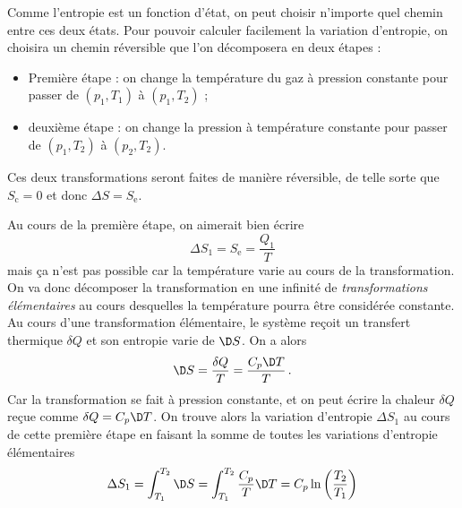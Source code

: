 \documentclass{cours}
\begin{document}
Comme l'entropie est un fonction d'état, on peut choisir n'importe quel chemin entre ces deux états. Pour pouvoir calculer facilement la variation d'entropie, on choisira un chemin réversible que l'on décomposera en deux étapes :
\begin{itemize}
  \item Première étape : on change la température du gaz à pression constante pour passer de $(p_1, T_1)$ à $(p_1, T_2)$ ;
  \item deuxième étape : on change la pression à température constante pour passer de $(p_1, T_2)$ à $(p_2, T_2)$.  
\end{itemize}
Ces deux transformations seront faites de manière réversible, de telle sorte que $S_\text{c}=0$ et donc $\Delta S = S_\text{e}$. 

Au cours de la première étape, on aimerait bien écrire 
\begin{equation}
  \Delta S_1 = S_\text{e} = \frac{Q_1}{T}
\end{equation}
mais ça n'est pas possible car la température varie au cours de la transformation. On va donc décomposer la transformation en une infinité de \emph{transformations élémentaires} au cours desquelles la température pourra être considérée constante. Au cours d'une transformation élémentaire, le système reçoit un transfert thermique $\delta Q$ et son entropie varie de $\D S$. On a alors 
\begin{equation}
  \D S = \frac{\delta Q}{T} = \frac{C_p\D T}{T}\,.
\end{equation}
%
Car la transformation se fait à pression constante, et on peut écrire la chaleur $\delta Q$ reçue comme $\delta Q = C_p \D T$. On trouve alors la variation d'entropie $\Delta S_1$ au cours de cette première étape en faisant la somme de toutes les variations d'entropie élémentaires
\begin{equation}
  \Delta S_1 = \int_{T_1}^{T_2}\D S = \int_{T_1}^{T_2}\frac{C_p}{T}\D T = C_p \ln \left( \frac{T_2}{T_1} \right) 
\end{equation}
\end{document}
